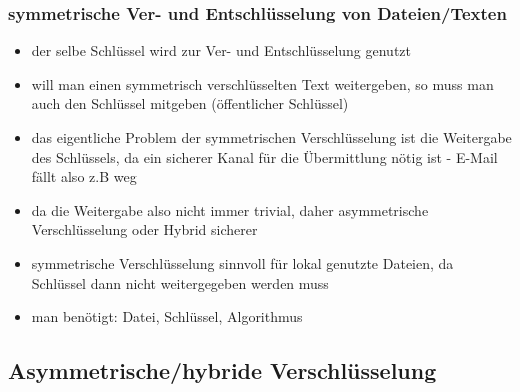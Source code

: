 \documentclass[12pt,a4paper]{article}
\begin{document}
\subsubsection{symmetrische Ver- und Entschlüsselung von Dateien/Texten}
\begin{itemize}
    \item der selbe Schlüssel wird zur Ver- und Entschlüsselung genutzt
    \item will man einen symmetrisch verschlüsselten Text weitergeben, so muss man auch den Schlüssel mitgeben (öffentlicher Schlüssel)
    \item das eigentliche Problem der symmetrischen Verschlüsselung ist die Weitergabe des Schlüssels, da ein sicherer Kanal für die Übermittlung nötig ist - E-Mail fällt also z.B weg
    \item da die Weitergabe also nicht immer trivial, daher asymmetrische Verschlüsselung oder Hybrid sicherer
    \item symmetrische Verschlüsselung sinnvoll für lokal genutzte Dateien, da Schlüssel dann nicht weitergegeben werden muss
    \item man benötigt: Datei, Schlüssel, Algorithmus
\end{itemize}
\bigskip
\subsection{Asymmetrische/hybride Verschlüsselung}
\end{document}
